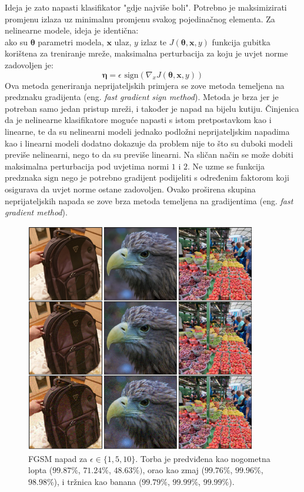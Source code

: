 \documentclass[utf8, diplomski]{fer}
\begin{document}
\par
Ideja je zato napasti klasifikator "gdje najviše boli". Potrebno je maksimizirati promjenu izlaza uz minimalnu promjenu svakog pojedinačnog elementa. Za nelinearne modele, ideja je identična: \\
ako su $\boldsymbol{\theta}$ parametri modela, $\boldsymbol{x}$ ulaz, $y$ izlaz te $J(\boldsymbol{\theta}, \boldsymbol{x}, y)$ funkcija gubitka korištena za treniranje mreže, maksimalna perturbacija za koju je uvjet norme zadovoljen je:
\begin{equation}
	\boldsymbol{\eta} = \epsilon \text{ sign}(\nabla_{x}J(\boldsymbol{\theta}, \boldsymbol{x}, y))
\end{equation}
Ova metoda generiranja neprijateljskih primjera se zove metoda temeljena na predznaku gradijenta (eng. \textit{fast gradient sign method}). Metoda je brza jer je potreban samo jedan pristup mreži, i također je napad na bijelu kutiju.
Činjenica da je nelinearne klasifikatore moguće napasti s istom pretpostavkom kao i linearne, te da su nelinearni modeli jednako podložni neprijateljskim napadima kao i linearni modeli dodatno dokazuje da problem nije to što su duboki modeli previše nelinearni, nego to da su previše linearni. Na sličan način se može dobiti maksimalna perturbacija pod uvjetima normi $1$ i $2$. Ne uzme se funkcija predznaka $\text{sign}$ nego je potrebno gradijent podijeliti s određenim faktorom koji osigurava da uvjet norme ostane zadovoljen. Ovako proširena skupina neprijateljskih napada se zove brza metoda temeljena na gradijentima (eng. \textit{fast gradient method}). \\
\begin{figure}[H]
\centering
\includegraphics[width=0.9\textwidth,keepaspectratio]{img/results/fgm_inf_1510.png}
\caption{FGSM napad za $\epsilon \in \{1, 5, 10\}$. Torba je predviđena kao nogometna lopta ($99.87\%$, $71.24\%$, $48.63\%)$, orao kao zmaj ($99.76\%$, $99.96\%$, $98.98\%$), i tržnica kao banana ($99.79\%$, $99.99\%$, $99.99\%$).}
\end{figure}\label{fgsm_ex}
\end{document}
